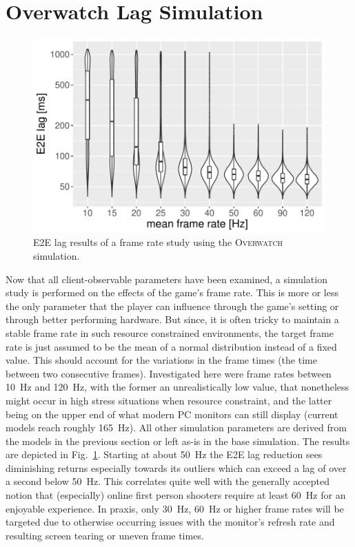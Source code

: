 \section{Overwatch Lag Simulation}
\label{sec:simulation}

\begin{figure}
	\centering
	\includegraphics[width=1.0\columnwidth]{images/lagsim.pdf}
	\caption{\acrshort{E2E} lag results of a frame rate study using the \textsc{Overwatch} simulation.}
\label{fig:lagsim}
\end{figure}

Now that all client-observable parameters have been examined, a simulation study is performed on the effects of the game's frame rate. This is more or less the only parameter that the player can influence through the game's setting or through better performing hardware. But since, it is often tricky to maintain a stable frame rate in such resource constrained environments, the target frame rate is just assumed to be the mean of a normal distribution instead of a fixed value. This should account for the variations in the frame times (the time between two consecutive frames). Investigated here were frame rates between \SI{10}{\hertz} and \SI{120}{\hertz}, with the former an unrealistically low value, that nonetheless might occur in high stress situations when resource constraint, and the latter being on the upper end of what modern PC monitors can still display (current models reach roughly \SI{165}{\hertz}). All other simulation parameters are derived from the models in the previous section or left as-is in the base simulation. The results are depicted in Fig.~\ref{fig:lagsim}. Starting at about \SI{50}{\hertz} the \gls{E2E} lag reduction sees diminishing returns especially towards its outliers which can exceed a lag of over a second below \SI{50}{\hertz}. This correlates quite well with the generally accepted notion that (especially) online first person shooters require at least \SI{60}{\hertz} for an enjoyable experience. In praxis, only \SI{30}{\hertz}, \SI{60}{\hertz} or higher frame rates will be targeted due to otherwise occurring issues with the monitor's refresh rate and resulting screen tearing or uneven frame times.





